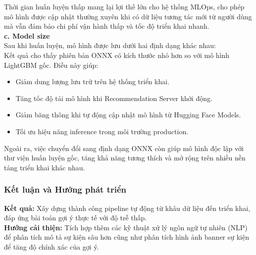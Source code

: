 Thời gian huấn luyện thấp mang lại lợi thế lớn cho hệ thống MLOps, cho phép mô hình được cập nhật thường xuyên khi có dữ liệu tương tác mới từ người dùng mà vẫn đảm bảo chi phí vận hành thấp và tốc độ triển khai nhanh.\\
\textbf{c. Model size}\\
Sau khi huấn luyện, mô hình được lưu dưới hai định dạng khác nhau:\\
Kết quả cho thấy phiên bản ONNX có kích thước nhỏ hơn so với mô hình LightGBM gốc. Điều này giúp:
\begin{itemize}
    \item[-] Giảm dung lượng lưu trữ trên hệ thống triển khai.
    \item[-] Tăng tốc độ tải mô hình khi Recommendation Server khởi động.
    \item[-] Giảm băng thông khi tự động cập nhật mô hình từ Hugging Face Models.
    \item[-] Tối ưu hiệu năng inference trong môi trường production.
\end{itemize}
Ngoài ra, việc chuyển đổi sang định dạng ONNX còn giúp mô hình độc lập với thư viện huấn luyện gốc, tăng khả năng tương thích và mở rộng trên nhiều nền tảng triển khai khác nhau.

\subsubsection{Kết luận và Hướng phát triển}
\indent \indent \textbf{Kết quả:} Xây dựng thành công pipeline tự động từ khâu dữ liệu đến triển khai, đáp ứng bài toán gợi ý thực tế với độ trễ thấp.\\
\indent \textbf{Hướng cải thiện:} Tích hợp thêm các kỹ thuật xử lý ngôn ngữ tự nhiên (NLP) để phân tích mô tả sự kiện sâu hơn cũng như phân tích hình ảnh banner sự kiện để tăng độ chính xác của gợi ý.


